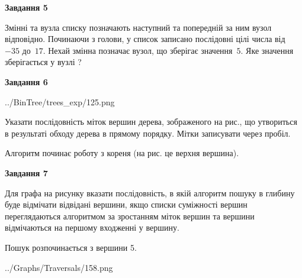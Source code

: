 \documentclass[12pt, ukrainian]{article}
\begin{document}
{\begin {large}
{\begin {center}\textbf{Завдання 5}\end {center}}\par
Змінні  та  вузла списку позначають наступний та попередній за ним вузол відповідно. Починаючи з голови, у список записано послідовні цілі числа від~$-35$ до~$17$. Нехай змінна  позначає вузол, що зберігає значення~$5$.
Яке значення зберігається у вузлі  ?\par
\newpage

{\begin {center}\textbf{Завдання 6}\end {center}}\par

\begin{center}
	{../BinTree/trees_exp/125.png}
\end{center}
Указати послідовність міток вершин дерева, зображеного на рис., що утвориться в результаті обходу дерева в прямому порядку. Мітки записувати через пробіл.\par Алгоритм починає роботу з кореня (на рис. це верхня вершина).\par
\newpage

{\begin {center}\textbf{Завдання 7}\end {center}}\par
Для графа на рисунку вказати послідовність, в якій алгоритм пошуку в глибину буде відмічати відвідані вершини, якщо списки суміжності вершин переглядаються алгоритмом за зростанням міток вершин та вершини відмічаються на першому вход\-женні у вершину.\par
Пошук розпочинається з вершини 5.\par

\begin{center}
	{../Graphs/Traversals/158.png}
\end{center}\par
\newpage


\end{large}}
\end{document}
